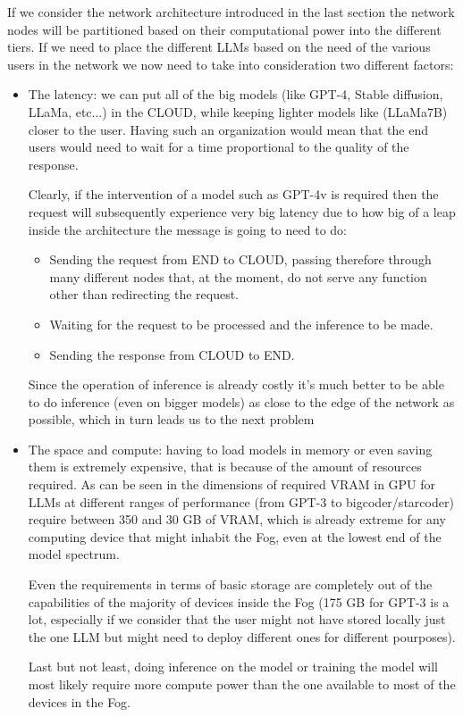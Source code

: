 If we consider the network architecture introduced in the last section the network nodes will be
partitioned based on their computational power into the different tiers. If we need to place the
different LLMs based on the need of the various users in the network we now need to take into
consideration two different factors:
\begin{itemize}
	\item The latency: we can put all of the big models (like GPT-4, Stable diffusion, LLaMa,
	      etc...) in the CLOUD, while keeping lighter models like (LLaMa7B) closer to the
	      user. Having such an organization would mean that the end users would need to wait for a
		  time proportional to the quality of the response.

	      Clearly, if the intervention of a model such as GPT-4v is required then the request will
		  subsequently experience very big latency due to how big of a leap inside the architecture
		  the message is going to need to do:
	      \begin{itemize}
		      \item Sending the request from END to CLOUD, passing therefore through many
		            different nodes that, at the moment, do not serve any function other
		            than redirecting the request.
		      \item Waiting for the request to be processed and the inference to be made.
		      \item Sending the response from CLOUD to END.
	      \end{itemize}
	      Since the operation of inference is already costly it's much better to be able to do
	      inference (even on bigger models) as close to the edge of the network as possible, which
		  in turn leads us to the next problem

	\item The space and compute: having to load models in memory or even saving them is
	      extremely expensive, that is because of the amount of resources required.
	      As can be seen in \cite{hug-optimization} the dimensions of required VRAM in GPU for LLMs at
	      different ranges of performance (from GPT-3 to bigcoder/starcoder) require between 350 and
	      30 GB of VRAM, which is already extreme for any computing device that might inhabit the
		  Fog, even at the lowest end of the model spectrum.

	      Even the requirements in terms of basic storage are completely out of the capabilities of
	      the majority of devices inside the Fog (175 GB for GPT-3 is a lot, especially if we consider
	      that the user might not have stored locally just the one LLM but might need to deploy
		  different ones for different pourposes).

	      Last but not least, doing inference on the model or training the model will most likely
	      require more compute power than the one available to most of the devices in the Fog.
\end{itemize}

